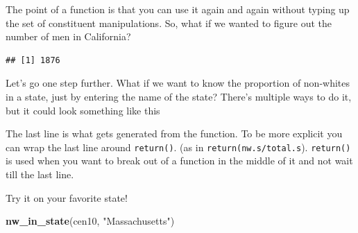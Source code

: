 \documentclass[
]{book}
\newenvironment{Shaded}{\begin{snugshade}}{\end{snugshade}}
\newcommand{\ControlFlowTok}[1]{\textcolor[rgb]{0.13,0.29,0.53}{\textbf{#1}}}
\newcommand{\KeywordTok}[1]{\textcolor[rgb]{0.13,0.29,0.53}{\textbf{#1}}}
\newcommand{\NormalTok}[1]{#1}
\newcommand{\OperatorTok}[1]{\textcolor[rgb]{0.81,0.36,0.00}{\textbf{#1}}}
\newcommand{\StringTok}[1]{\textcolor[rgb]{0.31,0.60,0.02}{#1}}
\theoremstyle{definition}
\theoremstyle{definition}
\theoremstyle{definition}
\theoremstyle{remark}
\begin{document}
The point of a function is that you can use it again and again without typing up the set of constituent manipulations. So, what if we wanted to figure out the number of men in California?

\begin{Shaded}
\end{Shaded}

\begin{verbatim}
## [1] 1876
\end{verbatim}

Let's go one step further. What if we want to know the proportion of non-whites in a state, just by entering the name of the state? There's multiple ways to do it, but it could look something like this

\begin{Shaded}
\end{Shaded}

The last line is what gets generated from the function. To be more explicit you can wrap the last line around \texttt{return()}. (as in \texttt{return(nw.s/total.s}). \texttt{return()} is used when you want to break out of a function in the middle of it and not wait till the last line.

Try it on your favorite state!

\begin{Shaded}
\begin{Highlighting}[]
\KeywordTok{nw\_in\_state}\NormalTok{(cen10, }\StringTok{"Massachusetts"}\NormalTok{)}
\end{Highlighting}
\end{Shaded}
\end{document}
